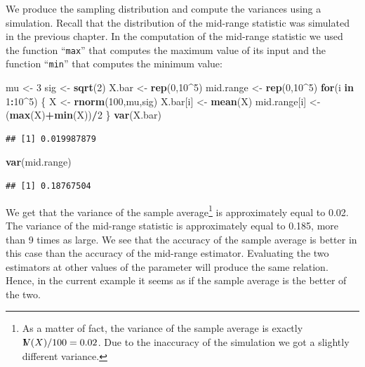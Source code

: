 \documentclass[]{krantz}
\makeatletter
\newenvironment{Shaded}{\begin{snugshade}}{\end{snugshade}}
\newcommand{\KeywordTok}[1]{\textcolor[rgb]{0.13,0.29,0.53}{\textbf{#1}}}
\newcommand{\DecValTok}[1]{\textcolor[rgb]{0.00,0.00,0.81}{#1}}
\newcommand{\StringTok}[1]{\textcolor[rgb]{0.31,0.60,0.02}{#1}}
\newcommand{\ControlFlowTok}[1]{\textcolor[rgb]{0.13,0.29,0.53}{\textbf{#1}}}
\newcommand{\OperatorTok}[1]{\textcolor[rgb]{0.81,0.36,0.00}{\textbf{#1}}}
\newcommand{\NormalTok}[1]{#1}
\newcommand{\Var}{{\rm I\kern-.3em V}}
\newenvironment{kframe}{%
\medskip{}
\setlength{\fboxsep}{.8em}
 \def\at@end@of@kframe{}%
 \ifinner\ifhmode%
  \def\at@end@of@kframe{\end{minipage}}%
  \begin{minipage}{\columnwidth}%
 \fi\fi%
 \def\FrameCommand##1{\hskip\@totalleftmargin \hskip-\fboxsep
 \colorbox{shadecolor}{##1}\hskip-\fboxsep
     \hskip-\linewidth \hskip-\@totalleftmargin \hskip\columnwidth}%
 \MakeFramed {\advance\hsize-\width
   \@totalleftmargin\z@ \linewidth\hsize
   \@setminipage}}%
 {\par\unskip\endMakeFramed%
 \at@end@of@kframe}
\renewenvironment{Shaded}{\begin{kframe}}{\end{kframe}}
\theoremstyle{definition}
\theoremstyle{definition}
\theoremstyle{definition}
\theoremstyle{remark}
\makeatother
\begin{document}
We produce the sampling distribution and compute the variances using a
simulation. Recall that the distribution of the mid-range statistic was
simulated in the previous chapter. In the computation of the mid-range
statistic we used the function ``\texttt{max}'' that computes the
maximum value of its input and the function ``\texttt{min}'' that
computes the minimum value:

\begin{Shaded}
\begin{Highlighting}[]
\NormalTok{mu <-}\StringTok{ }\DecValTok{3}
\NormalTok{sig <-}\StringTok{ }\KeywordTok{sqrt}\NormalTok{(}\DecValTok{2}\NormalTok{)}
\NormalTok{X.bar <-}\StringTok{ }\KeywordTok{rep}\NormalTok{(}\DecValTok{0}\NormalTok{,}\DecValTok{10}\OperatorTok{^}\DecValTok{5}\NormalTok{)}
\NormalTok{mid.range <-}\StringTok{ }\KeywordTok{rep}\NormalTok{(}\DecValTok{0}\NormalTok{,}\DecValTok{10}\OperatorTok{^}\DecValTok{5}\NormalTok{)}
\ControlFlowTok{for}\NormalTok{(i }\ControlFlowTok{in} \DecValTok{1}\OperatorTok{:}\DecValTok{10}\OperatorTok{^}\DecValTok{5}\NormalTok{) \{}
\NormalTok{  X <-}\StringTok{ }\KeywordTok{rnorm}\NormalTok{(}\DecValTok{100}\NormalTok{,mu,sig)}
\NormalTok{  X.bar[i] <-}\StringTok{ }\KeywordTok{mean}\NormalTok{(X)}
\NormalTok{  mid.range[i] <-}\StringTok{ }\NormalTok{(}\KeywordTok{max}\NormalTok{(X)}\OperatorTok{+}\KeywordTok{min}\NormalTok{(X))}\OperatorTok{/}\DecValTok{2}
\NormalTok{\}}
\KeywordTok{var}\NormalTok{(X.bar)}
\end{Highlighting}
\end{Shaded}

\begin{verbatim}
## [1] 0.019987879
\end{verbatim}

\begin{Shaded}
\begin{Highlighting}[]
\KeywordTok{var}\NormalTok{(mid.range)}
\end{Highlighting}
\end{Shaded}

\begin{verbatim}
## [1] 0.18767504
\end{verbatim}

We get that the variance of the sample average\footnote{As a matter of
  fact, the variance of the sample average is exactly
  \(\Var(X)/100 = 0.02\). Due to the inaccuracy of the simulation we got
  a slightly different variance.} is approximately equal to 0.02. The
variance of the mid-range statistic is approximately equal to 0.185,
more than 9 times as large. We see that the accuracy of the sample
average is better in this case than the accuracy of the mid-range
estimator. Evaluating the two estimators at other values of the
parameter will produce the same relation. Hence, in the current example
it seems as if the sample average is the better of the two.
\end{document}
